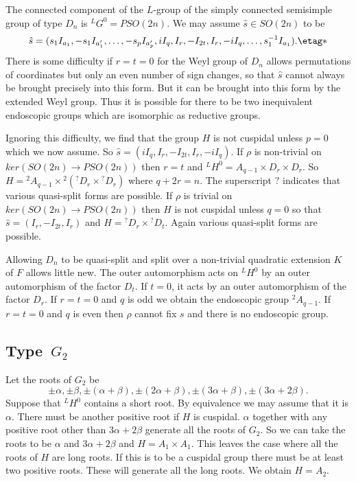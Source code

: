\documentclass{memo-l}
\theoremstyle{definition}
\theoremstyle{remark}
\numberwithin{section}{chapter}
\numberwithin{equation}{chapter}
\begin{document}
   The connected component of the $L$-group of the simply connected
semisimple group of type $D_{n}$ is ${}^{L}G^{0} = PSO(2n)$.  We may assume
$\hat s  \in  SO(2n)$ to be 
$$
\hat s  = (s_{1}I_{a_{1}},-s_{1}I_{a_{1}'},\ldots,-s_{p}I_{a_{p}'}, 
iI_{q},I_{r},-I_{2t},I_{r},-iI_{q},\ldots ,s_{1}^{-1}I_{a_1}).	 \etag *
$$
There is some difficulty if $r = t = 0$ for the Weyl group of $D_{n}$ allows
permutations of coordinates but only an even number of sign changes, so
that $\hat s $ cannot always be brought precisely into this form.  But it
can be brought into this form by the extended Weyl group.  Thus it is
possible for there to be two inequivalent endoscopic groups which are
isomorphic as reductive groups.

   Ignoring this difficulty, we find that the group $H$ is not cuspidal
unless $p = 0$ which we now assume.  So $\hat s
 = (iI_{q},I_{r},-I_{2t},I_{r},-iI_{q})$.  If ${\rho }$ is non-trivial on
$ker(SO(2n) {\to} PSO(2n))$ then $r = t$ and ${}^{L}H^{0}  =  A_{q-1} \times
D_{r} \times D_{r}$.  So $H  =  {}^{2}A_{q-1} \times {}^{2}({}^{?}D_{r} \times
{}^{?}D_{r})$ where $q+2r = n$.  The superscript $?$ indicates that various
quasi-split forms are possible.  If ${\rho }$ is trivial on $ker(SO(2n)
{\to} PSO(2n))$ then $H$ is not cuspidal unless $q = 0$ so that $\hat s  = 
(I_{r},-I_{2t},I_{r})$ and $H  =  {}^{?}D_{r} \times {}^{?}D_{t}$.  Again
various quasi-split forms are possible.

   Allowing $D_{n}$ to be quasi-split and split over a non-trivial
quadratic extension $K$ of $F$ allows little new.  The outer automorphism
acts on ${}^{L}H^{0}$ by an outer automorphism of the factor $D_{t}$.  If
$t = 0$, it acts by an outer automorphism of the factor $D_{r}$.  If $r = t = 0$
and $q$ is odd we obtain the endoscopic group ${}^{2}A_{q-1}$.  If $r = t = 0$
and $q$ is even then ${\rho }$ cannot fix  $s$ and there is no endoscopic
group.

\subsection{Type\ $G_2$}

   Let the roots of $G_{2}$ be $${\pm}{\alpha}, {\pm}{\beta},
{\pm}({\alpha}+{\beta}), {\pm}(2{\alpha}+{\beta}),
{\pm}(3{\alpha}+{\beta}), {\pm}(3{\alpha}+2{\beta}).$$  Suppose that
${}^{L}H^{0}$ contains a short root.  By equivalence we may assume that it is
${\alpha}$.  There must be another positive root if $H$ is cuspidal.
${\alpha}$ together with any positive root other than $3{\alpha}+2{\beta}$
generate all the roots of $G_{2}$.  So we can take the roots to be
${\alpha}$ and $3{\alpha}+2{\beta}$ and $H  =  A_{1} \times A_{1}$.  This
leaves the case where all the roots of $H$ are long roots.  If this is to
be a cuspidal group there must be at least two positive roots.  These will
generate all the long roots.  We obtain $H  =  A_{2}$.
\end{document}
